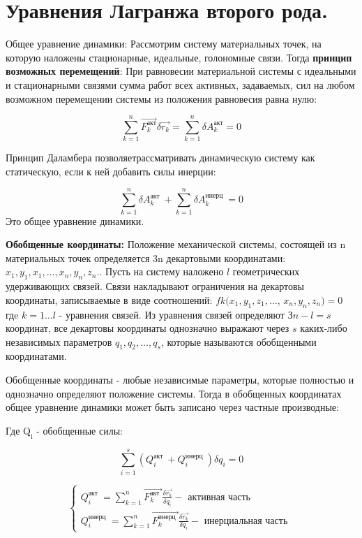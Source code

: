 \section{Уравнения Лагранжа второго рода.}
Общее уравнение динамики:
Рассмотрим систему материальных точек, на которую наложены стационарные, идеальные, голономные связи. Тогда \textbf{принцип возможных перемещений}: При равновесии материальной системы с идеальными и стационарными связями сумма работ всех активных, задаваемых, сил на любом возможном перемещении системы из положения равновесия равна нулю:

$$
\sum_{k=1}^{n} \overrightarrow{F_{k}^{\text{акт}}} \delta \overrightarrow{r_{k}}=\sum_{k=1}^{n} \delta A_{k}^{\text{акт}}=0
$$

Принцип Даламбера позволяетрассматривать динамическую систему как статическую, если к ней добавить силы инерции:

$$
\sum_{k=1}^{n} \delta A_{k}^{\text {акт }}+\sum_{k=1}^{n} \delta A_{k}^{\text {инерц }}=0
$$
Это общее уравнение динамики.


\textbf{Обобщенные координаты:} Положение механической системы, состоящей из $\mathrm{n}$ материальных точек определяется $3 \mathrm{n}$ декартовыми координатами: $x_1, y_1, x_1, ..., x_n, y_n, z_n.$. Пусть на систему наложено $l$ геометрических удерживающих связей. Связи накладывают ограничения на декартовы координаты, записываемые в виде соотношений: $f k(x_1, y_1, z_1, \ldots$, $x_n, y_n, z_n)=0$ гдe $k=1 \ldots l$ - уравнения связей. Из уравнения связей определяют $Зn-l=s$ координат, все декартовы координаты однозначно выражают через $s$ каких-либо независимых параметров $q_1, q_2, \ldots, q_s$, которые называются обобщенными координатами. 

Обобщенные координаты - любые независимые параметры, которые полностью и однозначно определяют положение системы. Тогда в обобщенных координатах общее уравнение динамики может быть записано через частные производные:

Где $\mathrm{Q}_{\mathrm{i}}$ - обобщенные силы:

$$
\sum_{i=1}^{s}\left(Q_{i}^{\text {акт }}+Q_{i}^{\text {инерц }}\right) \delta q_{i}=0
$$

$$
\left\{\begin{array}{c}
Q_{i}^{\text {акт }}=\sum_{k=1}^{n} \overrightarrow{F_{k}^{\text {акт }}} \frac{\delta \overrightarrow{r_{k}}}{\delta q_{i}}-\text { активная часть } \\
Q_{i}^{\text {инерц }}=\sum_{k=1}^{n} \overrightarrow{F_{k}^{\text {инерц }}} \frac{\delta \overrightarrow{r_{k}}}{\delta q_{i}}-\text { инерциальная часть }
\end{array}\right.
$$

